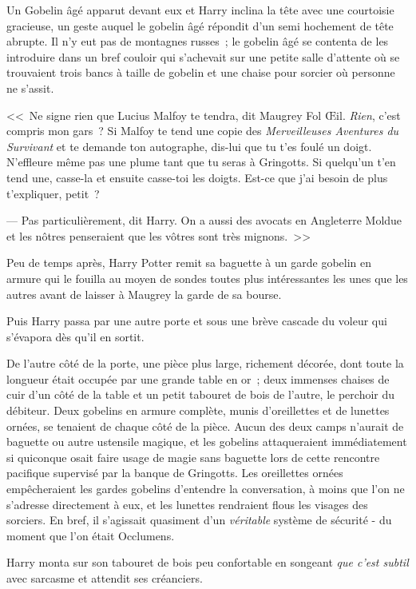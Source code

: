 Un Gobelin âgé apparut devant eux et Harry inclina la tête avec une courtoisie gracieuse, un geste auquel le gobelin âgé répondit d'un semi hochement de tête abrupte. Il n'y eut pas de montagnes russes~; le gobelin âgé se contenta de les introduire dans un bref couloir qui s'achevait sur une petite salle d'attente où se trouvaient trois bancs à taille de gobelin et une chaise pour sorcier où personne ne s'assit.

<<~Ne signe rien que Lucius Malfoy te tendra, dit Maugrey Fol Œil. \emph{Rien}, c'est compris mon gars~? Si Malfoy te tend une copie des \emph{Merveilleuses Aventures du Survivant} et te demande ton autographe, dis-lui que tu t'es foulé un doigt. N'effleure même pas une plume tant que tu seras à Gringotts. Si quelqu'un t'en tend une, casse-la et ensuite casse-toi les doigts. Est-ce que j'ai besoin de plus t'expliquer, petit~?

--- Pas particulièrement, dit Harry. On a aussi des avocats en Angleterre Moldue et les nôtres penseraient que les vôtres sont très mignons.~>>

Peu de temps après, Harry Potter remit sa baguette à un garde gobelin en armure qui le fouilla au moyen de sondes toutes plus intéressantes les unes que les autres avant de laisser à Maugrey la garde de sa bourse.

Puis Harry passa par une autre porte et sous une brève cascade du voleur qui s'évapora dès qu'il en sortit.

De l'autre côté de la porte, une pièce plus large, richement décorée, dont toute la longueur était occupée par une grande table en or~; deux immenses chaises de cuir d'un côté de la table et un petit tabouret de bois de l'autre, le perchoir du débiteur. Deux gobelins en armure complète, munis d'oreillettes et de lunettes ornées, se tenaient de chaque côté de la pièce. Aucun des deux camps n'aurait de baguette ou autre ustensile magique, et les gobelins attaqueraient immédiatement si quiconque osait faire usage de magie sans baguette lors de cette rencontre pacifique supervisé par la banque de Gringotts. Les oreillettes ornées empêcheraient les gardes gobelins d'entendre la conversation, à moins que l'on ne s'adresse directement à eux, et les lunettes rendraient flous les visages des sorciers. En bref, il s'agissait quasiment d'un \emph{véritable} système de sécurité - du moment que l'on était Occlumens.

Harry monta sur son tabouret de bois peu confortable en songeant \emph{que c'est subtil} avec sarcasme et attendit ses créanciers.

